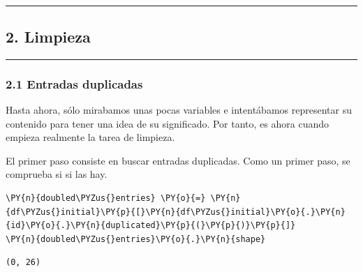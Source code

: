    { \hspace*{\fill} \\}
    
    \begin{center}\rule{0.5\linewidth}{\linethickness}\end{center}

\subsection{2. Limpieza}\label{limpieza}

\begin{center}\rule{0.5\linewidth}{\linethickness}\end{center}

\subsubsection{2.1 Entradas duplicadas}\label{entradas-duplicadas}

Hasta ahora, sólo mirabamos unas pocas variables e intentábamos
representar su contenido para tener una idea de su significado. Por
tanto, es ahora cuando empieza realmente la tarea de limpieza.

El primer paso consiste en buscar entradas duplicadas. Como un primer
paso, se comprueba si si las hay.

    \begin{tcolorbox}[breakable, size=fbox, boxrule=1pt, pad at break*=1mm,colback=cellbackground, colframe=cellborder]
\begin{Verbatim}[commandchars=\\\{\}]
\PY{n}{doubled\PYZus{}entries} \PY{o}{=} \PY{n}{df\PYZus{}initial}\PY{p}{[}\PY{n}{df\PYZus{}initial}\PY{o}{.}\PY{n}{id}\PY{o}{.}\PY{n}{duplicated}\PY{p}{(}\PY{p}{)}\PY{p}{]}
\PY{n}{doubled\PYZus{}entries}\PY{o}{.}\PY{n}{shape}
\end{Verbatim}
\end{tcolorbox}

            \begin{tcolorbox}[breakable, boxrule=.5pt, size=fbox, pad at break*=1mm, opacityfill=0]
\begin{Verbatim}[commandchars=\\\{\}]
(0, 26)
\end{Verbatim}
\end{tcolorbox}
        
